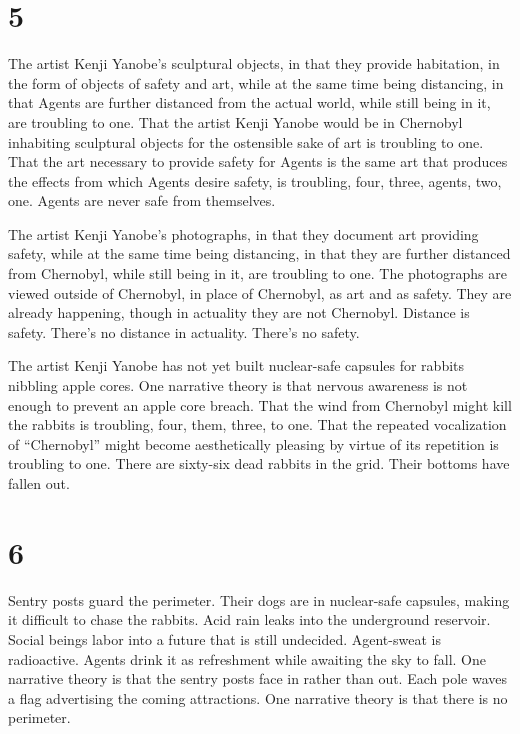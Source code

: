 \documentclass[
]{memoir}
\begin{document}
\hypertarget{section-6}{%
\section*{5}\label{section-6}}

The artist Kenji Yanobe's sculptural objects, in that they provide
habitation, in the form of objects of safety and art, while at the same
time being distancing, in that Agents are further distanced from the
actual world, while still being in it, are troubling to one. That the
artist Kenji Yanobe would be in Chernobyl inhabiting sculptural objects
for the ostensible sake of art is troubling to one. That the art
necessary to provide safety for Agents is the same art that produces the
effects from which Agents desire safety, is troubling, four, three,
agents, two, one. Agents are never safe from themselves.

The artist Kenji Yanobe's photographs, in that they document art
providing safety, while at the same time being distancing, in that they
are further distanced from Chernobyl, while still being in it, are
troubling to one. The photographs are viewed outside of Chernobyl, in
place of Chernobyl, as art and as safety. They are already happening,
though in actuality they are not Chernobyl. Distance is safety. There's
no distance in actuality. There's no safety.

The artist Kenji Yanobe has not yet built nuclear-safe capsules for
rabbits nibbling apple cores. One narrative theory is that nervous
awareness is not enough to prevent an apple core breach. That the wind
from Chernobyl might kill the rabbits is troubling, four, them, three,
to one. That the repeated vocalization of ``Chernobyl'' might become
aesthetically pleasing by virtue of its repetition is troubling to one.
There are sixty-six dead rabbits in the grid. Their bottoms have fallen
out.

\hypertarget{section-7}{%
\section*{6}\label{section-7}}

Sentry posts guard the perimeter. Their dogs are in nuclear-safe
capsules, making it difficult to chase the rabbits. Acid rain leaks into
the underground reservoir. Social beings labor into a future that is
still undecided. Agent-sweat is radioactive. Agents drink it as
refreshment while awaiting the sky to fall. One narrative theory is that
the sentry posts face in rather than out. Each pole waves a flag
advertising the coming attractions. One narrative theory is that there
is no perimeter.
\end{document}
